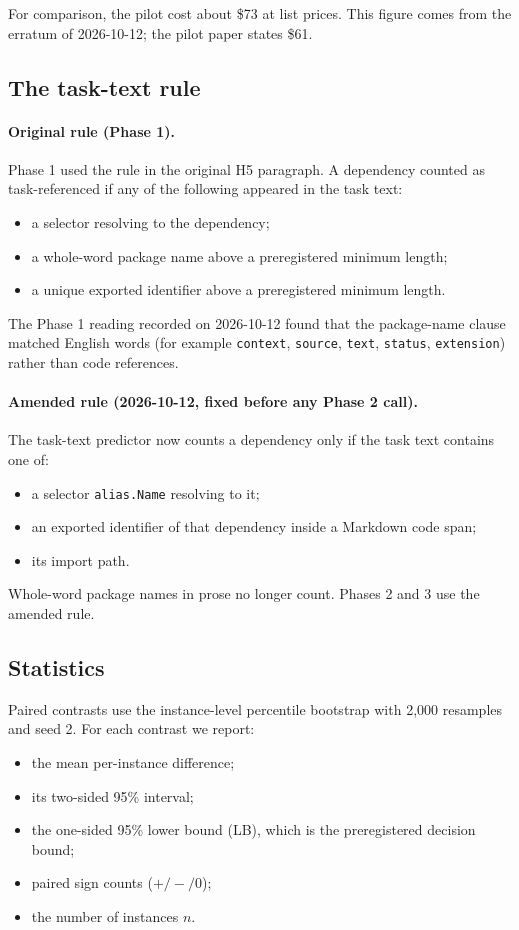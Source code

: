 For comparison, the pilot cost about \$73 at list prices. This figure comes from the erratum of 2026-10-12; the pilot paper states \$61.

\subsection{The task-text rule}\label{sec:taskrule}

\paragraph{Original rule (Phase 1).} Phase 1 used the rule in the original H5 paragraph. A dependency counted as task-referenced if any of the following appeared in the task text:
\begin{itemize}
\item a selector resolving to the dependency;
\item a whole-word package name above a preregistered minimum length;
\item a unique exported identifier above a preregistered minimum length.
\end{itemize}

The Phase 1 reading recorded on 2026-10-12 found that the package-name clause matched English words (for example \texttt{context}, \texttt{source}, \texttt{text}, \texttt{status}, \texttt{extension}) rather than code references.

\paragraph{Amended rule (2026-10-12, fixed before any Phase 2 call).} The task-text predictor now counts a dependency only if the task text contains one of:
\begin{itemize}
\item a selector \texttt{alias.Name} resolving to it;
\item an exported identifier of that dependency inside a Markdown code span;
\item its import path.
\end{itemize}
Whole-word package names in prose no longer count. Phases 2 and 3 use the amended rule.

\subsection{Statistics}

Paired contrasts use the instance-level percentile bootstrap with 2,000 resamples and seed 2. For each contrast we report:
\begin{itemize}
\item the mean per-instance difference;
\item its two-sided 95\% interval;
\item the one-sided 95\% lower bound (LB), which is the preregistered decision bound;
\item paired sign counts ($+/-/0$);
\item the number of instances $n$.
\end{itemize}


